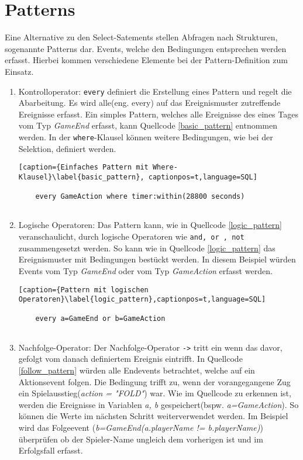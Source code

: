 \section{Patterns}

Eine Alternative zu den Select-Satements stellen Abfragen nach Strukturen, sogenannte Patterns dar. Events, welche den Bedingungen entsprechen werden erfasst. Hierbei kommen verschiedene Elemente bei der Pattern-Definition zum Einsatz.

\begin{enumerate}
	\item Kontrolloperator: \texttt{every} definiert die Erstellung eines Pattern und regelt die Abarbeitung. Es wird alle(eng. every) auf das Ereignismuster zutreffende Ereignisse erfasst. Ein simples Pattern, welches alle Ereignisse des eines Tages vom Typ \textit{GameEnd} erfasst, kann Quellcode \ref{basic_pattern} entnommen werden.
	In der \texttt{where}-Klausel können weitere Bedingungen, wie bei der Selektion, definiert werden.
	
	\begin{lstlisting}[caption={Einfaches Pattern mit Where-Klausel}\label{basic_pattern}, captionpos=t,language=SQL]
	
	every GameAction where timer:within(28800 seconds)
	
	\end{lstlisting}
	
	\item Logische Operatoren: 
	Das Pattern kann, wie in Quellcode \ref{logic_pattern} veranschaulicht, durch logische Operatoren wie \texttt{and, or , not} zusammengesetzt werden. So kann wie in Quellcode \ref{logic_pattern} das Ereignismuster mit Bedingungen bestückt werden. In diesem Beispiel würden Events vom Typ \textit{GameEnd} oder vom Typ \textit{GameAction} erfasst werden.
	
	\begin{lstlisting}[caption={Pattern mit logischen Operatoren}\label{logic_pattern},captionpos=t,language=SQL]
	
	every a=GameEnd or b=GameAction
	
	\end{lstlisting}
	
	\item Nachfolge-Operator:
	Der Nachfolge-Operator \texttt{->} tritt ein wenn das davor, gefolgt vom danach definiertem Ereignis eintrifft. In Quellcode \ref{follow_pattern}  würden alle Endevents betrachtet, welche auf ein Aktionsevent folgen. Die Bedingung trifft zu, wenn der vorangegangene Zug ein Spielausstieg(\textit{action = "FOLD"}) war.
	Wie im Quellcode zu erkennen ist, werden die Ereignisse in Variablen \textit{a, b} gespeichert(bspw. \textit{a=GameAction}). So können die Werte im nächsten Schritt weiterverwendet werden. Im Beispiel wird das Folgeevent (\textit{b=GameEnd(a.playerName != b.playerName)}) überprüfen ob der Spieler-Name ungleich dem vorherigen ist und im Erfolgsfall erfasst.
	

\end{enumerate}
